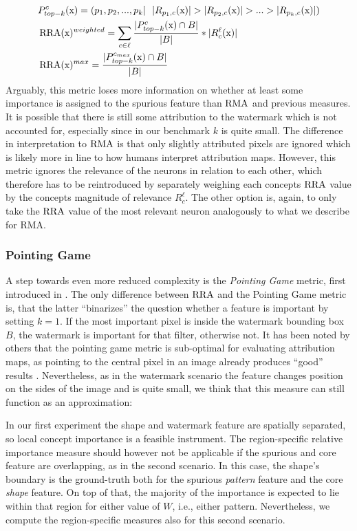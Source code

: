 \begin{align}
& P_{top-k}^{c}(\mathrm{x}) = (p_1, p_2,...,p_k | \ \  |R_{p_1,c}(\mathrm{x})| > |R_{p_2,c}(\mathrm{x})| > ... > |R_{p_k,c}(\mathrm{x})| ) \notag \\
& \RRA(\mathrm{x})^{weighted} = \sum_{c \in \ell} \frac{|P_{top-k}^{c}(\mathrm{x}) \cap B|}{|B|} * |R_c^{\ell}(\mathrm{x})| \\
& \RRA(\mathrm{x})^{max} = \frac{|P_{top-k}^{c_{max}}(\mathrm{x}) \cap B|}{|B|}
\end{align}
Arguably, this metric loses more information on whether at least some importance is assigned to the spurious feature than $\operatorname*{RMA}$ and previous measures. It is possible that there is still some attribution to the watermark which is not accounted for, especially since in our benchmark $k$ is quite small. The difference in interpretation to $\operatorname*{RMA}$ is that only slightly attributed pixels are ignored which is likely more in line to how humans interpret attribution maps. 
However, this metric ignores the relevance of the neurons in relation to each other, which therefore has to be reintroduced by separately weighing each concepts $\operatorname*{RRA}$ value by the concepts magnitude of relevance $R_c^{\ell}$. The other option is, again, to only take the $\operatorname*{RRA}$ value of the most relevant neuron analogously to what we describe for RMA. 

\subsubsection{Pointing Game}
A step towards even more reduced complexity is the \textit{Pointing Game} metric, first introduced in \citep{Zhang2016}. The only difference between $\operatorname*{RRA}$ and the Pointing Game metric is, that the latter ``binarizes'' the question whether a feature is important by setting $k = 1$. If the most important pixel is inside the watermark bounding box $B$, the watermark is important for that filter, otherwise not.
It has been noted by others that the pointing game metric is sub-optimal for evaluating attribution maps, as pointing to the central pixel in an image already produces ``good'' results \citep{Gu2019}. Nevertheless, as in the watermark scenario the feature changes position on the sides of the image and is quite small, we think that this measure can still function as an approximation: 

In our first experiment the shape and watermark feature are spatially separated, so local concept importance is a feasible instrument. The region-specific relative importance measure should however not be applicable if the spurious and core feature are overlapping, as in the second scenario. In this case, the shape's boundary is the ground-truth both for the spurious \textit{pattern} feature and the core \textit{shape} feature. On top of that, the majority of the importance is expected to lie within that region for either value of $W$, i.e., either pattern. 
Nevertheless, we compute the region-specific measures also for this second scenario. 

